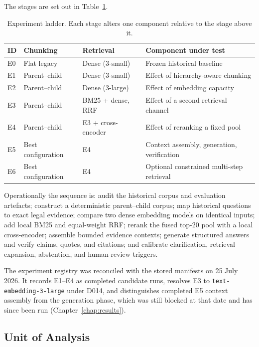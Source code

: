 The stages are set out in Table~\ref{tab:ladder}.

\begin{table}[htbp]
  \centering
  \caption{Experiment ladder. Each stage alters one component relative to the stage above it.}
  \label{tab:ladder}
  \small
  \begin{tabularx}{\textwidth}{@{}l l l X@{}}
    \toprule
    \textbf{ID} & \textbf{Chunking} & \textbf{Retrieval} & \textbf{Component under test} \\
    \midrule
    E0 & Flat legacy & Dense (3-small) & Frozen historical baseline \\
    E1 & Parent--child & Dense (3-small) & Effect of hierarchy-aware chunking \\
    E2 & Parent--child & Dense (3-large) & Effect of embedding capacity \\
    E3 & Parent--child & BM25 + dense, \ac{RRF} & Effect of a second retrieval channel \\
    E4 & Parent--child & E3 + cross-encoder & Effect of reranking a fixed pool \\
    E5 & Best configuration & E4 & Context assembly, generation, verification \\
    E6 & Best configuration & E4 & Optional constrained multi-step retrieval \\
    \bottomrule
  \end{tabularx}
\end{table}

Operationally the sequence is: audit the historical corpus and evaluation artefacts; construct a deterministic parent--child corpus; map historical questions to exact legal evidence; compare two dense embedding models on identical inputs; add local BM25 and equal-weight \ac{RRF}; rerank the fused top-20 pool with a local cross-encoder; assemble bounded evidence contexts; generate structured answers and verify claims, quotes, and citations; and calibrate clarification, retrieval expansion, abstention, and human-review triggers.

The experiment registry was reconciled with the stored manifests on 25 July 2026. It records E1--E4 as completed candidate runs, resolves E3 to \texttt{text-embedding-3-large} under D014, and distinguishes completed E5 context assembly from the generation phase, which was still blocked at that date and has since been run (Chapter~\ref{chap:results}).

\subsection{Unit of Analysis}

